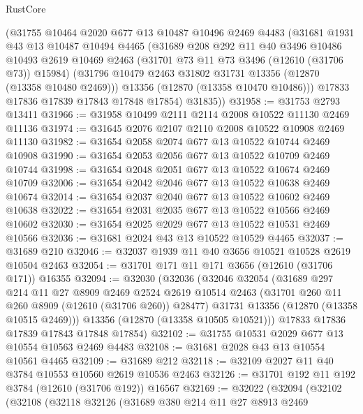 \begin{lexlean}{RustCore}
\begin{coremodule}
      (@31755
        @10464
        @2020
        @677
        @13
        @10487
        @10496
        @2469
        @4483
        (@31681
          @1931
          @43
          @13
          @10487
          @10494
          @4465
          (@31689
            @208
            @292
            @11
            @40
            @3496
            @10486
            @10493
            @2619
            @10469
            @2463
            (@31701 @73 @11 @73 @3496 (@12610 (@31706 @73)) @15984)
            (@31796 @10479 @2463 @31802 @31731 @13356 (@12870 (@13358 @10480 @2469)))
            @13356
            (@12870 (@13358 @10470 @10486)))
          @17833
          @17836
          @17839
          @17843
          @17848
          @17854)
        @31835))
@31958 := @31753 @2793 @13411
@31966 := @31958 @10499 @2111 @2114 @2008 @10522 @11130 @2469 @11136
@31974 := @31645 @2076 @2107 @2110 @2008 @10522 @10908 @2469 @11130
@31982 := @31654 @2058 @2074 @677 @13 @10522 @10744 @2469 @10908
@31990 := @31654 @2053 @2056 @677 @13 @10522 @10709 @2469 @10744
@31998 := @31654 @2048 @2051 @677 @13 @10522 @10674 @2469 @10709
@32006 := @31654 @2042 @2046 @677 @13 @10522 @10638 @2469 @10674
@32014 := @31654 @2037 @2040 @677 @13 @10522 @10602 @2469 @10638
@32022 := @31654 @2031 @2035 @677 @13 @10522 @10566 @2469 @10602
@32030 := @31654 @2025 @2029 @677 @13 @10522 @10531 @2469 @10566
@32036 := @31681 @2024 @43 @13 @10522 @10529 @4465
@32037 := @31689 @210
@32046 := @32037 @1939 @11 @40 @3656 @10521 @10528 @2619 @10504 @2463
@32054 := @31701 @171 @11 @171 @3656 (@12610 (@31706 @171)) @16355
@32094 := @32030
    (@32036
      (@32046
        @32054
        (@31689
          @297
          @214
          @11
          @27
          @8909
          @2469
          @2524
          @2619
          @10514
          @2463
          (@31701 @260 @11 @260 @8909 (@12610 (@31706 @260)) @28477)
          @31731
          @13356
          (@12870 (@13358 @10515 @2469)))
        @13356
        (@12870 (@13358 @10505 @10521)))
      @17833
      @17836
      @17839
      @17843
      @17848
      @17854)
@32102 := @31755 @10531 @2029 @677 @13 @10554 @10563 @2469 @4483
@32108 := @31681 @2028 @43 @13 @10554 @10561 @4465
@32109 := @31689 @212
@32118 := @32109 @2027 @11 @40 @3784 @10553 @10560 @2619 @10536 @2463
@32126 := @31701 @192 @11 @192 @3784 (@12610 (@31706 @192)) @16567
@32169 := @32022
    (@32094
      (@32102
        (@32108
          (@32118
            @32126
            (@31689
              @380
              @214
              @11
              @27
              @8913
              @2469

\end{coremodule}
\end{lexlean}
